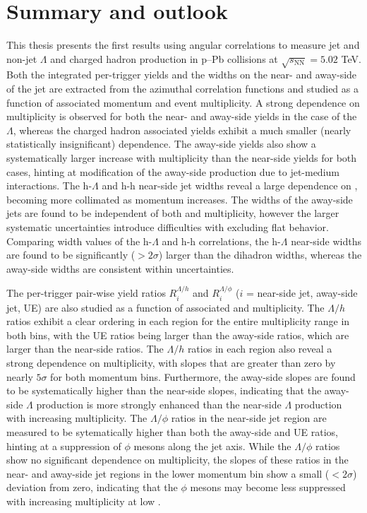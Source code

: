 \chapter{Summary and outlook}

This thesis presents the first results using angular correlations to measure jet and non-jet $\Lambda$ and charged hadron production in p--Pb collisions at $\sqrt{s_{\text{NN}}} = 5.02$ TeV. Both the integrated per-trigger yields and the widths on the near- and away-side of the jet are extracted from the azimuthal correlation functions and studied as a function of associated momentum and event multiplicity. A strong dependence on multiplicity is observed for both the near- and away-side yields in the case of the $\Lambda$, whereas the charged hadron associated yields exhibit a much smaller (nearly statistically insignificant) dependence. The away-side yields also show a systematically larger increase with multiplicity than the near-side yields for both cases, hinting at modification of the away-side production due to jet-medium interactions. The h-$\Lambda$ and h-h near-side jet widths reveal a large dependence on \pt, becoming more collimated as momentum increases. The widths of the away-side jets are found to be independent of both \pt and multiplicity, however the larger systematic uncertainties introduce difficulties with excluding flat behavior. Comparing width values of the h-$\Lambda$ and h-h correlations, the h-$\Lambda$ near-side widths are found to be significantly ($> 2\sigma$) larger than the dihadron widths, whereas the away-side widths are consistent within uncertainties.

The per-trigger pair-wise yield ratios $R_{i}^{\Lambda/h}$ and $R_{i}^{\Lambda/\phi}$ ($i$ = near-side jet, away-side jet, UE) are also studied as a function of associated \pt and multiplicity. The $\Lambda/h$ ratios exhibit a clear ordering in each region for the entire multiplicity range in both \pt bins, with the UE ratios being larger than the away-side ratios, which are larger than the near-side ratios. The $\Lambda/h$ ratios in each region also reveal a strong dependence on multiplicity, with slopes that are greater than zero by nearly $5\sigma$ for both momentum bins. Furthermore, the away-side slopes are found to be systematically higher than the near-side slopes, indicating that the away-side $\Lambda$ production is more strongly enhanced than the near-side $\Lambda$ production with increasing multiplicity. The $\Lambda/\phi$ ratios in the near-side jet region are measured to be sytematically higher than both the away-side and UE ratios, hinting at a suppression of $\phi$ mesons along the jet axis. While the $\Lambda/\phi$ ratios show no significant dependence on multiplicity, the slopes of these ratios in the near- and away-side jet regions in the lower momentum bin show a small ($<2\sigma$) deviation from zero, indicating that the $\phi$ mesons may become less suppressed with increasing multiplicity at low \pt.

